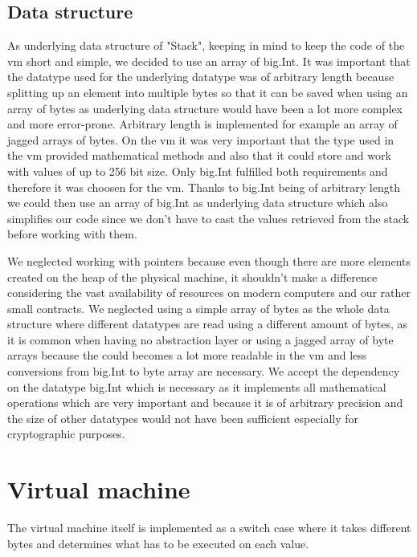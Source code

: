 \subsection{Data structure}
As underlying data structure of "Stack", keeping in mind to keep the code of the vm short and simple, we decided to use an array of big.Int. It was important that the datatype used for the underlying datatype was of arbitrary length because splitting up an element into multiple bytes so that it can be saved when using an array of bytes as underlying data structure would have been a lot more complex and more error-prone. Arbitrary length is implemented for example an array of jagged arrays of bytes. On the vm it was very important that the type used in the vm provided mathematical methods and also that it could store and work with values of up to 256 bit size. Only big.Int fulfilled both requirements and therefore it was choosen for the vm. Thanks to big.Int being of arbitrary length we could then use an array of big.Int as underlying data structure which also simplifies our code since we don't have to cast the values retrieved from the stack before working with them.

We neglected working with pointers because even though there are more elements created on the heap of the physical machine, it shouldn't make a difference considering the vast availability of resources on modern computers and our rather small contracts. We neglected using a simple array of bytes as the whole data structure where different datatypes are read using a different amount of bytes, as it is common when having no abstraction layer or using a jagged array of byte arrays because the could becomes a lot more readable in the vm and less conversions from big.Int to byte array are necessary. We accept the dependency on the datatype big.Int which is necessary as it implements all mathematical operations which are very important and because it is of arbitrary precision and the size of other datatypes would not have been sufficient especially for cryptographic purposes.

\section{Virtual machine}
The virtual machine itself is implemented as a switch case where it takes different bytes and determines what has to be executed on each value.


